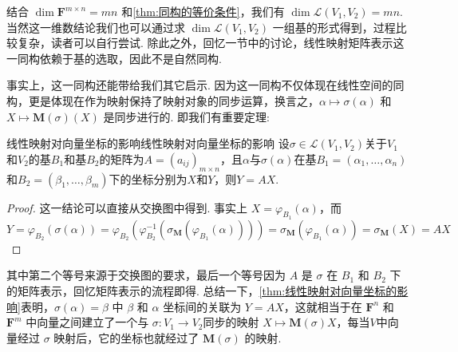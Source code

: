 结合 $\dim\mathbf{F}^{m\times n} = mn$ 和\autoref{thm:同构的等价条件}，我们有 $\dim\mathcal{L}(V_1,V_2) = mn$. 当然这一维数结论我们也可以通过求 $\dim\mathcal{L}(V_1,V_2)$ 一组基的形式得到，过程比较复杂，读者可以自行尝试. 除此之外，回忆一节中的讨论，线性映射矩阵表示这一同构依赖于基的选取，因此不是自然同构.

事实上，这一同构还能带给我们其它启示. 因为这一同构不仅体现在线性空间的同构，更是体现在作为映射保持了映射对象的同步运算，换言之，$\alpha \mapsto \sigma(\alpha)$ 和 $X \mapsto \mathbf{M}(\sigma)(X)$ 是同步进行的. 即我们有重要定理:

\begin{theorem}{线性映射对向量坐标的影响}{线性映射对向量坐标的影响}
    设$\sigma \in \mathcal{L}(V_1,V_2)$关于$V_1$和$V_2$的基$B_1$和基$B_2$的矩阵为$A=(a_{ij})_{m \times n}$，且$\alpha$与$\sigma(\alpha)$在基$B_1=(\alpha_1,\ldots,\alpha_n)$和$B_2=(\beta_1,\ldots,\beta_m)$下的坐标分别为$X$和$Y$，则$Y=AX$.
\end{theorem}

\begin{proof}
    这一结论可以直接从交换图中得到. 事实上 $X = \varphi_{B_1}(\alpha)$，而
    \[Y = \varphi_{B_2}(\sigma(\alpha)) = \varphi_{B_2}(\varphi_{B_2}^{-1}(\sigma_\mathbf{M}(\varphi_{B_1}(\alpha)))) = \sigma_\mathbf{M}(\varphi_{B_1}(\alpha)) = \sigma_\mathbf{M}(X) = AX\]
\end{proof}

其中第二个等号来源于交换图的要求，最后一个等号因为 $A$ 是 $\sigma$ 在 $B_1$ 和 $B_2$ 下的矩阵表示，回忆矩阵表示的流程即得. 总结一下，\autoref{thm:线性映射对向量坐标的影响}表明，$\sigma(\alpha) = \beta$ 中 $\beta$ 和 $\alpha$ 坐标间的关联为 $Y = AX$，这就相当于在 $\mathbf{F}^n$ 和 $\mathbf{F}^m$ 中向量之间建立了一个与 $\sigma: V_1 \to V_2$同步的映射 $X \mapsto \mathbf{M}(\sigma)X$，每当$V$中向量经过 $\sigma$ 映射后，它的坐标也就经过了 $\mathbf{M}(\sigma)$ 的映射.


